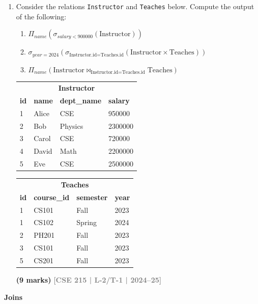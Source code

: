 \documentclass[12pt,a3paper]{article}
\newcommand{\yr}[1]{\hfill\textcolor{gray}{\small\textbf{[#1]}}}
\newcommand{\mk}[1]{\textcolor{orange!70!black}{\small\textbf{(#1 marks)}}}
\newcommand{\subtopic}[2]{%
  \vspace{10pt}
  \noindent\begin{tcolorbox}[colback=#1!8,colframe=#1,boxrule=0.6pt,arc=4pt,
    left=6pt,right=6pt,top=4pt,bottom=4pt]
    \small\bfseries\textcolor{#1}{#2}
  \end{tcolorbox}
  \vspace{2pt}
}
\begin{document}
\begin{enumerate}
\item Consider the relations \texttt{Instructor} and \texttt{Teaches} below. Compute the output of the following:
\begin{enumerate}
  \item $\Pi_{name}(\sigma_{salary < 900000}(\text{Instructor}))$
  \item $\sigma_{year=2024}(\sigma_{\text{Instructor.id}=\text{Teaches.id}}(\text{Instructor} \times \text{Teaches}))$
  \item $\Pi_{name}(\text{Instructor} \bowtie_{\text{Instructor.id}=\text{Teaches.id}} \text{Teaches})$
\end{enumerate}
\begin{center}
\small
\begin{tabular}{llll}
\toprule
\multicolumn{4}{c}{\textbf{Instructor}}\\
\textbf{id} & \textbf{name} & \textbf{dept\_name} & \textbf{salary}\\
\midrule
1 & Alice & CSE     & 950000\\
2 & Bob   & Physics & 2300000\\
3 & Carol & CSE     & 720000\\
4 & David & Math    & 2200000\\
5 & Eve   & CSE     & 2500000\\
\bottomrule
\end{tabular}
\quad
\begin{tabular}{llll}
\toprule
\multicolumn{4}{c}{\textbf{Teaches}}\\
\textbf{id} & \textbf{course\_id} & \textbf{semester} & \textbf{year}\\
\midrule
1 & CS101 & Fall   & 2023\\
1 & CS102 & Spring & 2024\\
2 & PH201 & Fall   & 2023\\
3 & CS101 & Fall   & 2023\\
5 & CS201 & Fall   & 2023\\
\bottomrule
\end{tabular}
\end{center}
\mk{9} \yr{CSE 215 | L-2/T-1 | 2024--25}

\end{enumerate}

\subtopic{cB}{Joins}
\label{sub:s3-joins}
\end{document}
